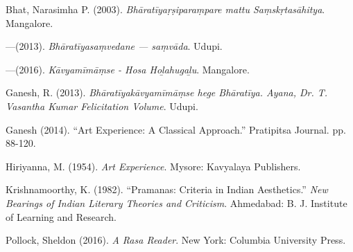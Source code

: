 \begin{thebibliography}{99}
\itemsep=2pt
Bhat, Narasimha P. (2003). {\sl Bhāratīyaṛṣiparaṃpare mattu Saṃskṛtasāhitya}. Mangalore. 

---\kern3pt(2013). {\sl Bhāratīyasaṃvedane --- saṃvāda}. Udupi.

---\kern3pt(2016). {\sl Kāvyamīmāṃse - Hosa Hoḻahugaḻu}. Mangalore.

Ganesh, R. (2013). {\sl Bhāratīyakāvyamīmāṃse hege Bhāratīya. Ayana, Dr. T. Vasantha Kumar Felicitation Volume}. Udupi.

Ganesh (2014). ``Art Experience: A Classical Approach.'' Pratipitsa Journal. pp. 88-120.

Hiriyanna, M. (1954). {\sl Art Experience}. Mysore: Kavyalaya Publishers.

Krishnamoorthy, K. (1982). ``Pramanas: Criteria in Indian Aesthetics.'' {\sl New Bearings of Indian Literary Theories and Criticism}. Ahmedabad: B. J. Institute of Learning and Research.

Pollock, Sheldon (2016). {\sl A Rasa Reader}. New York: Columbia University Press.
\end{thebibliography}

\theendnotes
